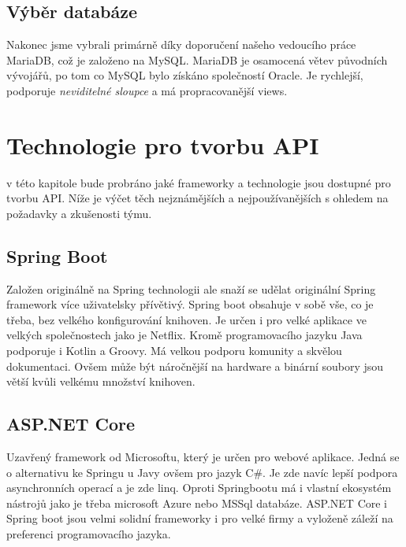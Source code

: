 \subsection{Výběr databáze}
Nakonec jsme vybrali primárně díky doporučení našeho vedoucího práce MariaDB, což je založeno na MySQL. MariaDB je osamocená větev původních vývojářů, po tom co MySQL bylo získáno společností Oracle. Je rychlejší, podporuje \textit{neviditelné sloupce} a má propracovanější views.

\section{Technologie pro tvorbu API}\label{sec:api_technologies}
v této kapitole bude probráno jaké frameworky a technologie jsou dostupné pro tvorbu API. Níže je výčet těch nejznámějších a nejpoužívanějších s ohledem na požadavky a zkušenosti týmu.

\subsection{Spring Boot}\label{sec:api_technologies:spring}
Založen originálně na Spring technologii ale snaží se udělat originální Spring framework více uživatelsky přívětivý. Spring boot obsahuje v sobě vše, co je třeba, bez velkého konfigurování knihoven. Je určen i pro velké aplikace ve velkých společnostech jako je Netflix. Kromě programovacího jazyku Java podporuje i Kotlin a Groovy. Má velkou podporu komunity a skvělou dokumentaci. Ovšem může být náročnější na hardware a binární soubory jsou větší kvůli velkému množství knihoven.

\subsection{ASP.NET Core}\label{sec:api_technologies:asp}
Uzavřený framework od Microsoftu, který je určen pro webové aplikace. Jedná se o alternativu ke Springu u Javy ovšem pro jazyk C\#. Je zde navíc lepší podpora asynchronních operací a je zde \gls{linq}. Oproti Springbootu má i vlastní ekosystém nástrojů jako je třeba microsoft Azure nebo MSSql databáze. ASP.NET Core i Spring boot jsou velmi solidní frameworky i pro velké firmy a vyloženě záleží na preferenci programovacího jazyka.

